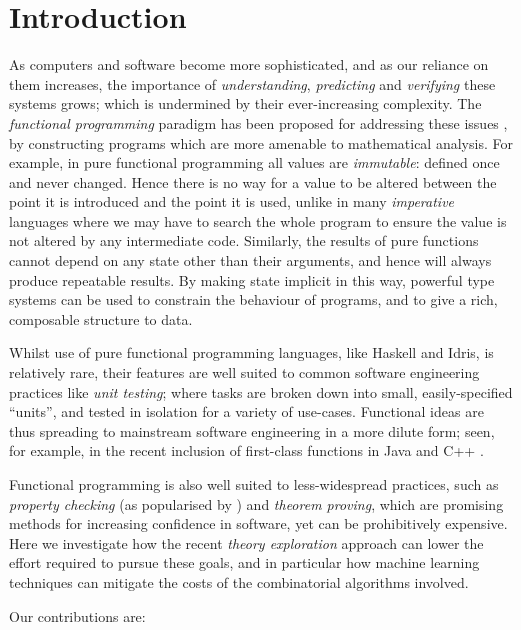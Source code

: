 \section{Introduction}

As computers and software become more sophisticated, and as our reliance on them increases, the importance of \emph{understanding}, \emph{predicting} and \emph{verifying} these systems grows; which is undermined by their ever-increasing complexity. The \emph{functional programming} paradigm has been proposed for addressing these issues \citep{hughes1989functional}, by constructing programs which are more amenable to mathematical analysis. For example, in pure functional programming all values are \emph{immutable}: defined once and never changed. Hence there is no way for a value to be altered between the point it is introduced and the point it is used, unlike in many \emph{imperative} languages where we may have to search the whole program to ensure the value is not altered by any intermediate code. Similarly, the results of pure functions cannot depend on any state other than their arguments, and hence will always produce repeatable results. By making state implicit in this way, powerful type systems can be used to constrain the behaviour of programs, and to give a rich, composable structure to data.

Whilst use of pure functional programming languages, like Haskell and Idris, is relatively rare, their features are well suited to common software engineering practices like \emph{unit testing}; where tasks are broken down into small, easily-specified ``units'', and tested in isolation for a variety of use-cases. Functional ideas are thus spreading to mainstream software engineering in a more dilute form; seen, for example, in the recent inclusion of first-class functions in Java \citep{gosling2015java} and C++ \citep{willcock2006lambda}.

Functional programming is also well suited to less-widespread practices, such as \emph{property checking} (as popularised by \qcheck{}) and \emph{theorem proving}, which are promising methods for increasing confidence in software, yet can be prohibitively expensive. Here we investigate how the recent \emph{theory exploration} approach can lower the effort required to pursue these goals, and in particular how machine learning techniques can mitigate the costs of the combinatorial algorithms involved.

Our contributions are:

